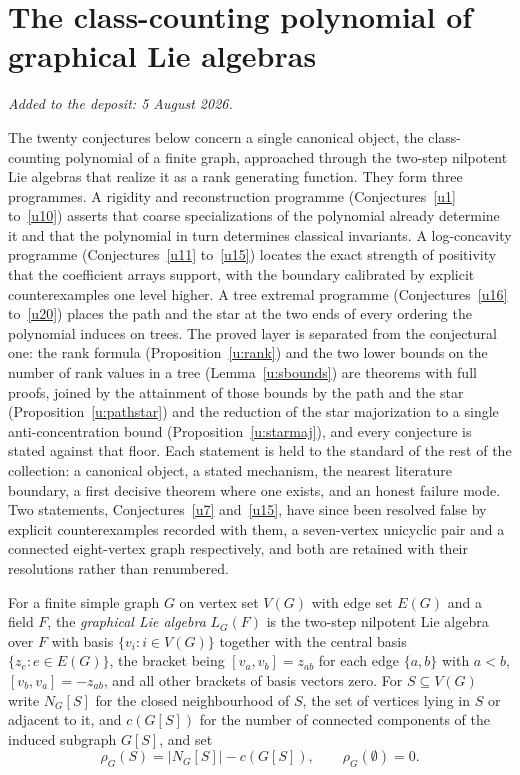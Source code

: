 \documentclass[11pt]{article}
\theoremstyle{definition}
\begin{document}
\part{The class-counting polynomial of graphical Lie algebras}

\medskip\noindent\emph{Added to the deposit: 5 August 2026.}\par\medskip

The twenty conjectures below concern a single canonical object, the class-counting polynomial of a finite graph, approached through the two-step nilpotent Lie algebras that realize it as a rank generating function.  They form three programmes.  A rigidity and reconstruction programme (Conjectures~\ref{u1} to~\ref{u10}) asserts that coarse specializations of the polynomial already determine it and that the polynomial in turn determines classical invariants.  A log-concavity programme (Conjectures~\ref{u11} to~\ref{u15}) locates the exact strength of positivity that the coefficient arrays support, with the boundary calibrated by explicit counterexamples one level higher.  A tree extremal programme (Conjectures~\ref{u16} to~\ref{u20}) places the path and the star at the two ends of every ordering the polynomial induces on trees.  The proved layer is separated from the conjectural one: the rank formula (Proposition~\ref{u:rank}) and the two lower bounds on the number of rank values in a tree (Lemma~\ref{u:sbounds}) are theorems with full proofs, joined by the attainment of those bounds by the path and the star (Proposition~\ref{u:pathstar}) and the reduction of the star majorization to a single anti-concentration bound (Proposition~\ref{u:starmaj}), and every conjecture is stated against that floor.  Each statement is held to the standard of the rest of the collection: a canonical object, a stated mechanism, the nearest literature boundary, a first decisive theorem where one exists, and an honest failure mode.  Two statements, Conjectures~\ref{u7} and~\ref{u15}, have since been resolved false by explicit counterexamples recorded with them, a seven-vertex unicyclic pair and a connected eight-vertex graph respectively, and both are retained with their resolutions rather than renumbered.

For a finite simple graph $G$ on vertex set $V(G)$ with edge set $E(G)$ and a field $F$, the \emph{graphical Lie algebra} $L_G(F)$ is the two-step nilpotent Lie algebra over $F$ with basis $\{v_i:i\in V(G)\}$ together with the central basis $\{z_e:e\in E(G)\}$, the bracket being $[v_a,v_b]=z_{ab}$ for each edge $\{a,b\}$ with $a<b$, $[v_b,v_a]=-z_{ab}$, and all other brackets of basis vectors zero.  For $S\subseteq V(G)$ write $N_G[S]$ for the closed neighbourhood of $S$, the set of vertices lying in $S$ or adjacent to it, and $c(G[S])$ for the number of connected components of the induced subgraph $G[S]$, and set
\[
\rho_G(S)=\bigl|N_G[S]\bigr|-c(G[S]),\qquad\rho_G(\emptyset)=0 .
\]
\end{document}
